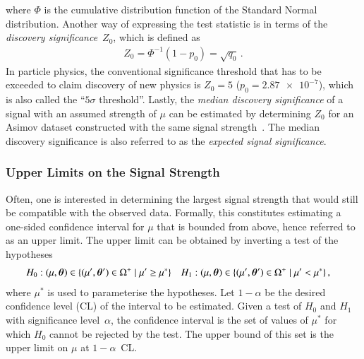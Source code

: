 where $\Phi$ is the cumulative distribution function of the Standard Normal
distribution. Another way of expressing the test statistic is in terms of the
\emph{discovery significance}~$Z_0$, which is defined as~\cite{Cowan:2010js}
\begin{align*}
  Z_0 = \Phi^{-1}(1 - p_0) = \sqrt{q_{0}} \,\text{.}
\end{align*}
In particle physics, the conventional significance threshold that has to be
exceeded to claim discovery of new physics is $Z_0 = 5$ ($p_0 = \num{2.87e-7}$),
which is also called the ``$5\sigma$ threshold''. Lastly, the \emph{median
  discovery significance} of a signal with an assumed strength of $\mu$ can be
estimated by determining $Z_0$ for an Asimov dataset constructed with the same
signal strength~\cite{Cowan:2010js}. The median discovery significance is also
referred to as the \emph{expected signal significance}.


\subsubsection{Upper Limits on the Signal Strength}

Often, one is interested in determining the largest signal strength that would
still be compatible with the observed data. Formally, this constitutes
estimating a one-sided confidence interval for $\mu$ that is bounded from above,
hence referred to as an upper limit. The upper limit can be obtained by
inverting a test of the hypotheses
\begin{align*}
  &H_0: (\mu, \bm{\theta}) \in \{ (\mu^\prime, \bm{\theta}^\prime) \in \Omega^+ \mid \mu^\prime \geq \mu^* \}
  &&H_1: (\mu, \bm{\theta}) \in \{ (\mu^\prime, \bm{\theta}^\prime) \in \Omega^+ \mid \mu^\prime < \mu^* \} \,\text{,}
\end{align*}
where $\mu^*$ is used to parameterise the hypotheses. Let $1 - \alpha$ be the
desired confidence level (CL) of the interval to be estimated. Given a test of
$H_0$ and $H_1$ with significance level~$\alpha$, the confidence interval is the
set of values of $\mu^*$ for which $H_0$ cannot be rejected by the test. The
upper bound of this set is
the upper limit on $\mu$ at $1 - \alpha$~CL.

